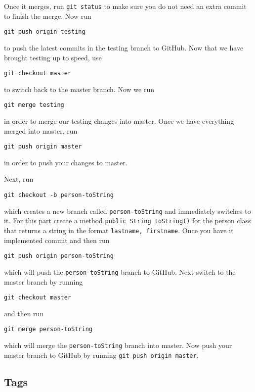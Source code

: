 \documentclass[notitlepage]{simple}
\begin{document}
Once it merges, run \verb|git status| to make sure you do not need an extra commit to finish the merge.
Now run
\begin{terminal}
	\verb|git push origin testing|
\end{terminal}
to push the latest commits in the testing branch to GitHub.
Now that we have brought testing up to speed, use
\begin{terminal}
	\verb|git checkout master|
\end{terminal}
to switch back to the master branch.
Now we run
\begin{terminal}
	\verb|git merge testing|
\end{terminal}
in order to merge our testing changes into master.
Once we have everything merged into master, run
\begin{terminal}
	\verb|git push origin master|
\end{terminal}
in order to push your changes to master.

Next, run
\begin{terminal}
	\verb|git checkout -b person-toString|
\end{terminal}
which creates a new branch called \verb|person-toString| and immediately switches to it.
For this part create a method \verb|public String toString()| for the person class that returns a string in the format \linebreak\verb|lastname, firstname|.
Once you have it implemented commit and then run
\begin{terminal}
	\verb|git push origin person-toString|
\end{terminal}
which will push the \verb|person-toString| branch to GitHub.
Next switch to the master branch by running
\begin{terminal}
	\verb|git checkout master|
\end{terminal}
and then run
\begin{terminal}
	\verb|git merge person-toString|
\end{terminal}
which will merge the \verb|person-toString| branch into master.
Now push your master branch to GitHub by running \verb|git push origin master|.

\subsection{Tags}
\end{document}
